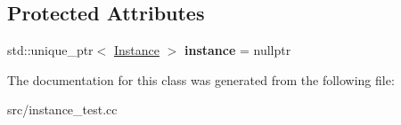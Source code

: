 \subsection*{Protected Attributes}
\begin{DoxyCompactItemize}
\item 
\hypertarget{class_instance_test_ae818f7a311cce549e005cd651a5e4ff1}{}\label{class_instance_test_ae818f7a311cce549e005cd651a5e4ff1} 
std\+::unique\+\_\+ptr$<$ \hyperlink{classae_1_1_instance}{Instance} $>$ {\bfseries instance} = nullptr
\end{DoxyCompactItemize}


The documentation for this class was generated from the following file\+:\begin{DoxyCompactItemize}
\item 
src/instance\+\_\+test.\+cc\end{DoxyCompactItemize}
